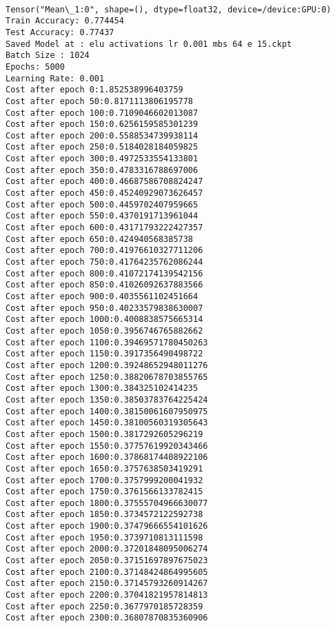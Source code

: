 \documentclass[11pt]{article}
\begin{document}
    \begin{center}
    \end{center}
    { \hspace*{\fill} \\}
    
    \begin{Verbatim}[commandchars=\\\{\}]
Tensor("Mean\_1:0", shape=(), dtype=float32, device=/device:GPU:0)
Train Accuracy: 0.774454
Test Accuracy: 0.77437
Saved Model at : elu activations lr 0.001 mbs 64 e 15.ckpt
Batch Size : 1024
Epochs: 5000
Learning Rate: 0.001  
Cost after epoch 0:1.852538996403759
Cost after epoch 50:0.8171113806195778
Cost after epoch 100:0.7109046602013087
Cost after epoch 150:0.6256159585301239
Cost after epoch 200:0.5588534739938114
Cost after epoch 250:0.5184028184059825
Cost after epoch 300:0.4972533554133801
Cost after epoch 350:0.4783316788697006
Cost after epoch 400:0.46687586708824247
Cost after epoch 450:0.45240929073626457
Cost after epoch 500:0.4459702407959665
Cost after epoch 550:0.4370191713961044
Cost after epoch 600:0.43171793222427357
Cost after epoch 650:0.424940568385738
Cost after epoch 700:0.41976610327711206
Cost after epoch 750:0.41764235762086244
Cost after epoch 800:0.41072174139542156
Cost after epoch 850:0.41026092637883566
Cost after epoch 900:0.4035561102451664
Cost after epoch 950:0.40233579838630007
Cost after epoch 1000:0.4008838575665314
Cost after epoch 1050:0.3956746765882662
Cost after epoch 1100:0.39469571780450263
Cost after epoch 1150:0.3917356490498722
Cost after epoch 1200:0.39248652948011276
Cost after epoch 1250:0.38820678703855765
Cost after epoch 1300:0.384325102414235
Cost after epoch 1350:0.38503783764225424
Cost after epoch 1400:0.38150061607950975
Cost after epoch 1450:0.38100560319305643
Cost after epoch 1500:0.3817292605296219
Cost after epoch 1550:0.37757619920343466
Cost after epoch 1600:0.37868174408922106
Cost after epoch 1650:0.3757638503419291
Cost after epoch 1700:0.3757999200041932
Cost after epoch 1750:0.3761566133782415
Cost after epoch 1800:0.37555704966630077
Cost after epoch 1850:0.3734572122592738
Cost after epoch 1900:0.37479666554101626
Cost after epoch 1950:0.3739710813111598
Cost after epoch 2000:0.37201848095006274
Cost after epoch 2050:0.37151697897675023
Cost after epoch 2100:0.37148424864995605
Cost after epoch 2150:0.37145793260914267
Cost after epoch 2200:0.37041821957814813
Cost after epoch 2250:0.3677970185728359
Cost after epoch 2300:0.36807870835360906

\end{Verbatim}
\end{document}
